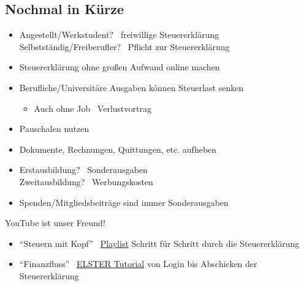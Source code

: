 \documentclass[draft]{beamer}
\newcommand{\n}{\hfill\\\vspace{0.25cm}}
\begin{document}
		\subsection{Nochmal in Kürze}
		
			\begin{frame}
				\begin{itemize}
					\item Angestellt/Werkstudent? \textrightarrow\ freiwillige Steuererklärung\\
					Selbstständig/Freiberufler? \textrightarrow\ Pflicht zur Steuererklärung\pause
					\item Steuererklärung ohne großen Aufwand online machen\pause
					\item Berufliche/Universitäre Ausgaben können Steuerlast senken
					\begin{itemize}
						\item Auch ohne Job \textrightarrow\ Verlustvortrag
					\end{itemize}
					\item Pauschalen nutzen
					\item Dokumente, Rechnungen, Quittungen, etc. aufheben\pause
					\item Erstausbildung? \textrightarrow\ Sonderausgaben\\
					Zweitausbildung? \textrightarrow\ Werbungskosten\vspace{-0.1cm}\\\pause
					\item Spenden/Mitgliedsbeiträge sind immer Sonderausgaben
				\end{itemize}
			\end{frame}
		
			\begin{frame}
				YouTube ist unser Freund!\n
				\begin{itemize}
					\item "`Steuern mit Kopf"' \textrightarrow\ \href{https://www.youtube.com/watch?v=vEYL7AlCTgw&list=PL0OXhlRkvak8sq4efIvHYxx4e_DrE8zZT}{Playlist} Schritt für Schritt durch die Steuererklärung
					\item "`Finanzfluss"' \textrightarrow\ \href{https://www.youtube.com/watch?v=FiAGN-RrHMg}{ELSTER Tutorial} von Login bis Abschicken der Steuererklärung
				\end{itemize}
			\end{frame}
	
\end{document}
